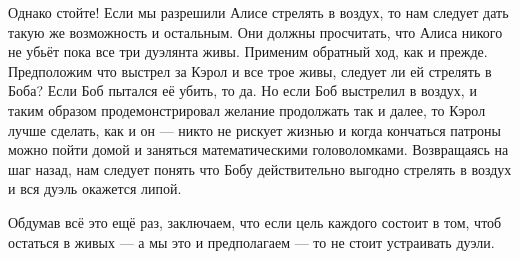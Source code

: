 Однако стойте!
Если мы разрешили Алисе стрелять в воздух, то нам следует дать такую же возможность и остальным. 
Они должны просчитать, что Алиса никого не убьёт пока все три дуэлянта живы. 
Применим обратный ход, как и прежде.
Предположим что выстрел за Кэрол и все трое живы,
следует ли ей стрелять в Боба? 
Если Боб пытался её убить, то да.
Но если Боб выстрелил в воздух, и таким образом продемонстрировал желание продолжать так и далее,
то Кэрол лучше сделать, как и он ---
никто не рискует жизнью и когда кончаться патроны можно пойти домой и заняться математическими головоломками.
Возвращаясь на шаг назад, нам следует понять что Бобу действительно выгодно стрелять в воздух и вся дуэль окажется липой.

Обдумав всё это ещё раз, заключаем, что если цель каждого состоит в том, чтоб остаться в живых --- а мы это и предполагаем --- то не стоит устраивать дуэли.
\heart


